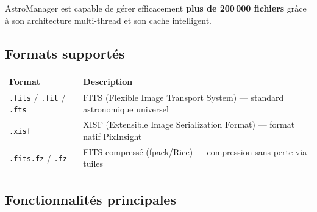\documentclass[a4paper,11pt]{article}
\begin{document}
\begin{tipbox}
AstroManager est capable de g\'{e}rer efficacement \textbf{plus de 200\,000 fichiers} gr\^{a}ce \`{a} son architecture multi-thread et son cache intelligent.
\end{tipbox}

\subsection{Formats support\'{e}s}

\begin{center}
\begin{tabularx}{0.85\textwidth}{l X}
\toprule
\textbf{Format} & \textbf{Description} \\
\midrule
\texttt{.fits} / \texttt{.fit} / \texttt{.fts} & FITS (Flexible Image Transport System) --- standard astronomique universel \\
\texttt{.xisf} & XISF (Extensible Image Serialization Format) --- format natif PixInsight \\
\texttt{.fits.fz} / \texttt{.fz} & FITS compress\'{e} (fpack/Rice) --- compression sans perte via tuiles \\
\bottomrule
\end{tabularx}
\end{center}

\subsection{Fonctionnalit\'{e}s principales}
\end{document}
